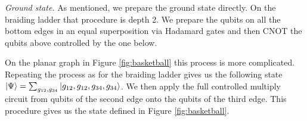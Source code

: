 \documentclass[two column]{article}
\begin{document}

\emph{Ground state.} As mentioned, we prepare the ground state directly. On the braiding ladder that procedure is depth 2. We prepare the qubits on all the bottom edges in an equal superposition via Hadamard gates and then CNOT the qubits above controlled by the one below. 

On the planar graph in Figure \ref{fig:basketball} this process is more complicated. Repeating the process as for the braiding ladder gives us the following state $\ket{\Psi} = \sum_{g_{12},g_{34}}\ket{g_{12},g_{12}, g_{34}, g_{34}}$. We then apply the full controlled multiply circuit from qubits of the second edge onto the qubits of the third edge. This procedure gives us the state defined in Figure \ref{fig:basketball}.
\end{document}
